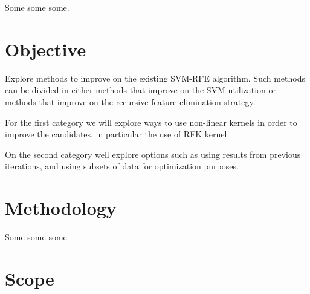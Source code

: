 Some some some.


\section{Objective}

Explore methods to improve on the existing SVM-RFE algorithm. Such methods can be divided in either methods that improve on the SVM utilization or methods that improve on the recursive feature elimination strategy.

For the first category we will explore ways to use non-linear kernels in order to improve the candidates, in particular the use of RFK kernel.

On the second category well explore options such as using results from previous iterations, and using subsets of data for optimization purposes.


\section{Methodology}

Some some some


\section{Scope}
